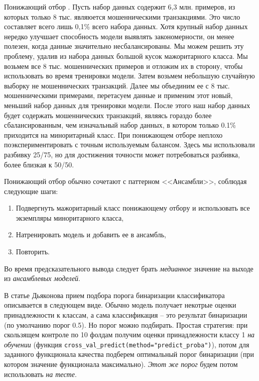 \documentclass[%
	11pt,
	a4paper,
	utf8,
		]{article}
\begin{document}
Понижающий отбор \cite[]{lakshmanan-mldp:2022}. Пусть набор данных содержит 6,3 млн. примеров, из которых только 8 тыс. являюется мошенническими транзакциями. Это число составляет всего лишь 0,1\% всего набора данных. Хотя крупный набор данных нередко улучшает способность модели выявлять закономерности, он менее полезен, когда данные значительно несбалансированы. Мы можем решить эту проблему, удалив из набора данных большой кусок мажоритарного класса. Мы возьмем все 8 тыс. мошеннических примеров и отложим их в сторону, чтобы использовать во время тренировки модели. Затем возьмем небольшую случайную выборку не мошеннических транзакций. Далее мы объединим ее с 8 тыс. мошенническими примерами, перетасуем данные и применим этот новый, меньший набор данных для тренировки модели. После этого наш набор данных будет содержать мошеннических транзакций, являясь гораздо более сбалансированным, чем изначальный набор данных, в котором только 0.1\% приходится на миноритарный класс. При понижающем отборе неплохо поэкспериментировать с точным используемым балансом. Здесь мы использовали разбивку 25/75, но для достижения точности может потребоваться разбивка, более близкая к 50/50.

Понижающий отбор обычно сочетают с паттерном <<Ансамбли>>, соблюдая следующие шаги:
\begin{enumerate}
	\item Подвергнуть мажоритарный класс понижающему отбору и использовать все экземпляры миноритарного класса,
	
	\item Натренировать модель и добавить ее в ансамбль,
	
	\item Повторить.
\end{enumerate}

Во время предсказательного вывода следует брать \emph{медианное} значение на выходе из \emph{ансамблевых моделей}.

В статье Дьяконова прием подбора порога бинаризации классификатора описывается в следующем виде. Обычно модель получает некотрые оценки принадлежности к классам, а сама классификация -- это результат бинаризации (по умолчанию порог 0.5). Но порог можно подбирать. Простая стратегия: при скользящем контроле по 10 фолдам получим оценки принадлежности классу 1 \emph{на обучении} (функция \texttt{cross\_val\_predict(method="predict\_proba")}), потом для заданного функционала качества подберем оптимальный порог бинаризации (при котором значение функционала максимально). \emph{Этот же порог} будем потом использовать \emph{на тесте}.
\end{document}
